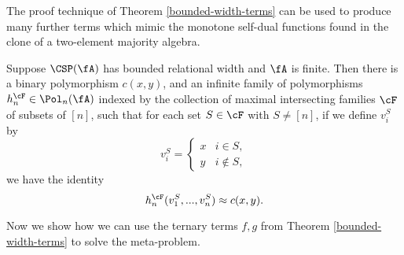 The proof technique of Theorem \ref{bounded-width-terms} can be used to produce many further terms which mimic the monotone self-dual functions found in the clone of a two-element majority algebra.

\begin{thm} Suppose $\CSP(\fA)$ has bounded relational width and $\fA$ is finite. Then there is a binary polymorphism $c(x,y)$, and an infinite family of polymorphisms $h_n^{\cF} \in \Pol_n(\fA)$ indexed by the collection of maximal intersecting families $\cF$ of subsets of $[n]$, such that for each set $S \in \cF$ with $S \ne [n]$, if we define $v_i^S$ by
\[
v_i^S = \begin{cases} x & i \in S,\\ y & i \not\in S,\end{cases}
\]
we have the identity
\[
h_n^\cF(v_1^S, ..., v_n^S) \approx c(x,y).
\]
\end{thm}

Now we show how we can use the ternary terms $f,g$ from Theorem \ref{bounded-width-terms} to solve the meta-problem.


